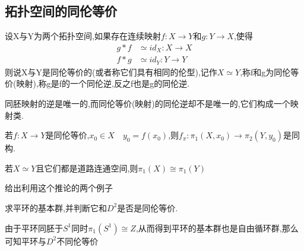 \subsection*{拓扑空间的同伦等价}
\begin{definition}
    设X与Y为两个拓扑空间,如果存在连续映射\(f: X \rightarrow Y \)和\(g: Y \rightarrow X \),使得\begin{align*}
        g*f &\simeq id_{X} : X \rightarrow X  \\
        f*g &\simeq id_{Y} : Y \rightarrow Y 
    \end{align*}
    则说X与Y是同伦等价的(或者称它们具有相同的伦型),记作\(X \simeq Y \),称f和g为同伦等价(映射),称g是f的一个同伦逆,反之f也是g的同伦逆.
\end{definition}
\begin{note}
    同胚映射的逆是唯一的,而同伦等价(映射)的同伦逆却不是唯一的,它们构成一个映射类.
\end{note}
\begin{corollary}
    若\(f: X \rightarrow Y \)是同伦等价,\(x_0 \in X \quad y_0 =f(x_0)\),则\(f_{\pi} : \pi_1 (X,x_0) \rightarrow \pi_2 (Y,y_0)\)是同构.
\end{corollary}
\begin{proposition}
    若\(X \simeq Y \)且它们都是道路连通空间,则\(\pi_1(X) \cong \pi_1 (Y)\)
\end{proposition}
给出利用这个推论的两个例子
\begin{example}
    求平环的基本群,并判断它和\(D^2\)是否是同伦等价.
\end{example}
\begin{solution}
    由于平环同胚于\(S^1\)同时\(\pi_1 (S^1) \cong Z \),从而得到平环的基本群也是自由循环群,那么可知平环与\(D^2\)不同伦等价\end{solution}
